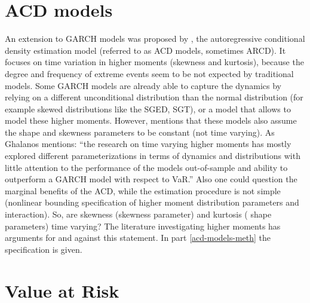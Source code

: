 \documentclass[a4paper, twoside]{templates/ociamthesis}
\begin{document}
\hypertarget{acd-models}{%
\section{ACD models}\label{acd-models}}

An extension to GARCH models was proposed by \textcite{hansen1994}, the autoregressive conditional density estimation model (referred to as ACD models, sometimes ARCD). It focuses on time variation in higher moments (skewness and kurtosis), because the degree and frequency of extreme events seem to be not expected by traditional models. Some GARCH models are already able to capture the dynamics by relying on a different unconditional distribution than the normal distribution (for example skewed distributions like the SGED, SGT), or a model that allows to model these higher moments. However, \textcite{ghalanos2016} mentions that these models also assume the shape and skewness parameters to be constant (not time varying). As Ghalanos mentions: ``the research on time varying higher moments has mostly explored different parameterizations in terms of dynamics and distributions with little attention to the performance of the models out-of-sample and ability to outperform a GARCH model with respect to VaR.'' Also one could question the marginal benefits of the ACD, while the estimation procedure is not simple (nonlinear bounding specification of higher moment distribution parameters and interaction). So, are skewness (skewness parameter) and kurtosis ( shape parameters) time varying? The literature investigating higher moments has arguments for and against this statement. In part \ref{acd-models-meth} the specification is given.

\hypertarget{value-at-risk}{%
\section{Value at Risk}\label{value-at-risk}}
\end{document}
